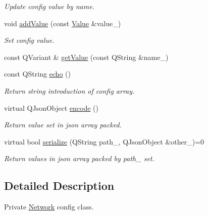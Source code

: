 \begin{DoxyCompactItemize}
\begin{DoxyCompactList}\small\item\em Update config value by name. \end{DoxyCompactList}\item 
void \mbox{\hyperlink{classeven_1_1_config_af024790ddfa56faacc4110df84a3d8c7}{add\+Value}} (const \mbox{\hyperlink{classeven_1_1_value}{Value}} \&value\+\_\+)
\begin{DoxyCompactList}\small\item\em Set config value. \end{DoxyCompactList}\item 
const Q\+Variant \& \mbox{\hyperlink{classeven_1_1_config_a0ad2a13202a4f192ae19f31b1c6d93e9}{get\+Value}} (const Q\+String \&name\+\_\+)
\item 
const Q\+String \mbox{\hyperlink{classeven_1_1_config_a648fc2031b84927f096cc5bff536383d}{echo}} ()
\begin{DoxyCompactList}\small\item\em Return string introduction of config array. \end{DoxyCompactList}\item 
\mbox{\label{classeven_1_1_config_ad8f1c40efccb8c9149746d15b3ccc128}} 
virtual Q\+Json\+Object \mbox{\hyperlink{classeven_1_1_config_ad8f1c40efccb8c9149746d15b3ccc128}{encode}} ()
\begin{DoxyCompactList}\small\item\em Return value set in json array packed. \end{DoxyCompactList}\item 
\mbox{\label{classeven_1_1_config_a6411ac3d0e72b6402ff847bff580ea98}} 
virtual bool \mbox{\hyperlink{classeven_1_1_config_a6411ac3d0e72b6402ff847bff580ea98}{serialize}} (Q\+String path\+\_\+, Q\+Json\+Object \&other\+\_\+)=0
\begin{DoxyCompactList}\small\item\em Return values in json array packed by path\+\_\+ set. \end{DoxyCompactList}\end{DoxyCompactItemize}


\subsection{Detailed Description}
Private \mbox{\hyperlink{classeven_1_1_network}{Network}} config class. 

